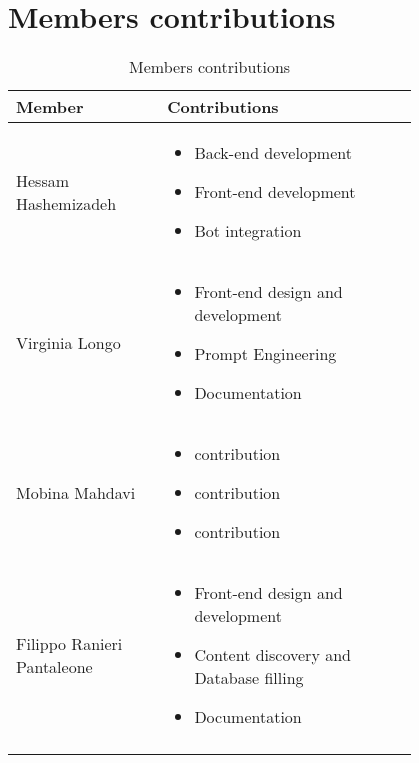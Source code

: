 \section{Members contributions}
\begin{longtable}
    {|m{0.3\linewidth}|m{0.5\linewidth}|}
            \hline
            \textbf{Member} & \textbf{Contributions}\\
            \hline
            \endhead
                Hessam Hashemizadeh &
                \begin{itemize}
                    \item Back-end development
                    \item Front-end development
                    \item Bot integration
                \end{itemize} \\
            \hline
                 Virginia Longo &
                 \begin{itemize}
                    \item Front-end design and development
                    \item Prompt Engineering
                    \item Documentation
                \end{itemize} \\
            \hline
                 Mobina Mahdavi &
                 \begin{itemize}
                    \item contribution
                    \item contribution
                    \item contribution
                \end{itemize} \\
            \hline
                Filippo Ranieri Pantaleone &
                \begin{itemize}
                    \item Front-end design and development
                    \item Content discovery and Database filling
                    \item Documentation
                \end{itemize} \\
            \hline
            \caption{Members contributions}
            \label{table:mem_contributions}
\end{longtable}
